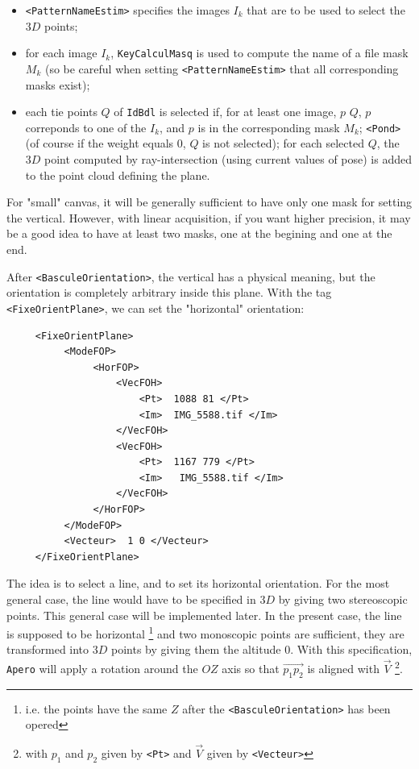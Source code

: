 \begin{itemize}
   \item {\tt <PatternNameEstim>} specifies the images $I_k$ that are to be used to
         select the $3D$ points;

   \item for each image $I_k$, {\tt KeyCalculMasq} is used to compute the name 
         of  a file mask $M_k$ (so be careful when setting {\tt <PatternNameEstim>}
         that all corresponding masks exist);


   \item   each tie points $Q$  of  {\tt IdBdl} is selected if,  for at least one
           image, $p$  $Q$, $p$ correponds to one of the $I_k$, and $p$ is
           in the corresponding mask $M_k$;  {\tt <Pond>} (of course if the
           weight equals $0$, $Q$ is not selected);   for each selected $Q$,
           the $3D$ point computed by ray-intersection (using current values of pose)
           is added to the point cloud defining the plane.
\end{itemize}

For "small" canvas, it will be generally sufficient to have only one mask for
setting the vertical. However, with linear acquisition, if you want higher precision,
it may be a good idea to have at least two masks, one at the begining and one at
the end.


After  {\tt  <BasculeOrientation>}, the vertical has a physical meaning, but the orientation
is completely arbitrary inside this plane. With the tag {\tt <FixeOrientPlane>},
we can set the "horizontal" orientation:


{\scriptsize
\begin{verbatim}
     <FixeOrientPlane>
          <ModeFOP>
               <HorFOP>
                   <VecFOH>
                       <Pt>  1088 81 </Pt>
                       <Im>  IMG_5588.tif </Im>
                   </VecFOH>
                   <VecFOH>
                       <Pt>  1167 779 </Pt>
                       <Im>   IMG_5588.tif </Im>
                   </VecFOH>
               </HorFOP>
          </ModeFOP>
          <Vecteur>  1 0 </Vecteur>
     </FixeOrientPlane>
\end{verbatim}
}

The idea is to select a  line, and to set its horizontal orientation.
For the most general case, the line  would have to be specified in $3D$ by 
giving two stereoscopic points. This general case will be implemented
later. In the present case, the line is supposed to be horizontal
\footnote{i.e. the points have the same $Z$ after the {\tt <BasculeOrientation>}
has been opered} and two monoscopic points are sufficient, they are transformed into $3D$ points
by giving them the altitude $0$. With this specification,
{\tt Apero} will apply a rotation around the $OZ$ axis so that 
$\overrightarrow{p_1p_2} $ is aligned with $\vec{V}$ \footnote{with $p_1$
and $p_2$ given by {\tt <Pt>} and $\vec{V}$ given by {\tt <Vecteur>}}.


